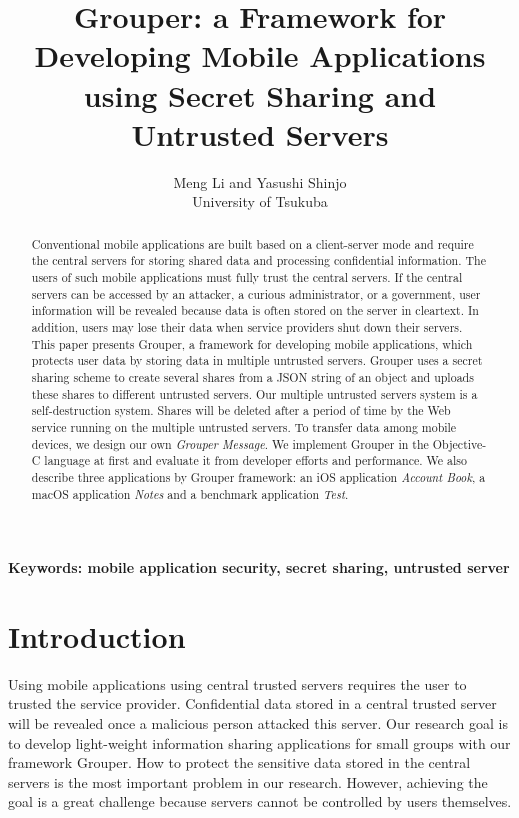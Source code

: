 \documentclass[twocolumn,10pt]{article}
\begin{document}
\title{\bf Grouper: a Framework for Developing Mobile Applications using Secret Sharing and Untrusted Servers}

\author{
	Meng Li and Yasushi Shinjo \\
	University of Tsukuba
}

\maketitle

\begin{abstract}

Conventional mobile applications are built based on a client-server mode and require the central servers for storing shared data and processing confidential information.
The users of such mobile applications must fully trust the central servers. 
If the central servers can be accessed by an attacker, a curious administrator, or a government, user information will be revealed because data is often stored on the server in cleartext. 
In addition, users may lose their data when service providers shut down their servers.
This paper presents Grouper, a framework for developing mobile applications, which protects user data by storing data in multiple untrusted servers.
Grouper uses a secret sharing scheme to create several shares from a JSON string of an object and uploads these shares to different untrusted servers. 
Our multiple untrusted servers system is a self-destruction system.
Shares will be deleted after a period of time by the Web service running on the multiple untrusted servers.
To transfer data among mobile devices, we design our own \emph{Grouper Message}. 
We implement Grouper in the Objective-C language at first and evaluate it from developer efforts and performance. We also describe three applications by Grouper framework: an iOS application \emph{Account Book}, a macOS application \emph{Notes} and a benchmark application \emph{Test}.

\end{abstract}

\textbf{Keywords: mobile application security, secret sharing, untrusted server}

\section{Introduction}

Using mobile applications using central trusted servers requires the user to trusted the service provider.
Confidential data stored in a central trusted server will be revealed once a malicious person attacked this server.
Our research goal is to develop light-weight information sharing applications for small groups with our framework Grouper. 
How to protect the sensitive data stored in the central servers is the most important problem in our research.
However, achieving the goal is a great challenge because servers cannot be controlled by users themselves.
\end{document}

